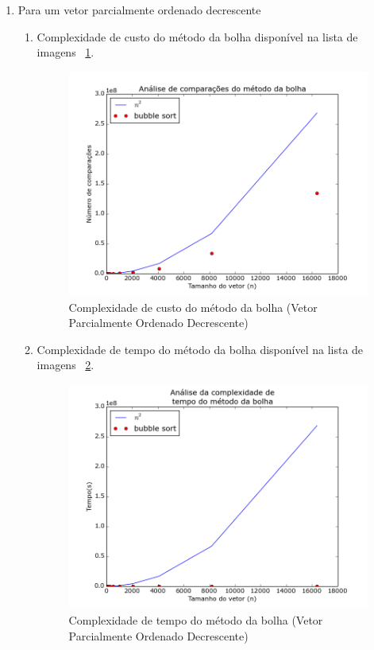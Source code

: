 \documentclass[12pt,a4paper,twoside]{report}
\begin{document}
\begin{enumerate}
			
			\item Para um vetor parcialmente ordenado decrescente
										\begin{enumerate}
											\item Complexidade de custo do método da bolha disponível na lista de imagens ~\ref{fig:BubblePlot1POD}.
											\begin{figure}[!h]
												\centering
												\includegraphics[scale=0.6]{../imagens/Bubble/bubble_plot_1_parcialmente_ordenado_decrescente.png}
												\caption{Complexidade de custo do método da bolha (Vetor Parcialmente Ordenado Decrescente) \label{fig:BubblePlot1POD}}
											\end{figure}
											
											
											\item Complexidade de tempo do método da bolha disponível na lista de imagens ~\ref{fig:BubblePlot2POD}.
											\begin{figure}[!h]
												\centering
												\includegraphics[scale=0.6]{../imagens/Bubble/bubble_plot_2_parcialmente_ordenado_decrescente.png}
												\caption{Complexidade de tempo do método da bolha (Vetor Parcialmente Ordenado Decrescente) \label{fig:BubblePlot2POD}}
											\end{figure}
											

\end{enumerate}
\end{enumerate}
\end{document}
